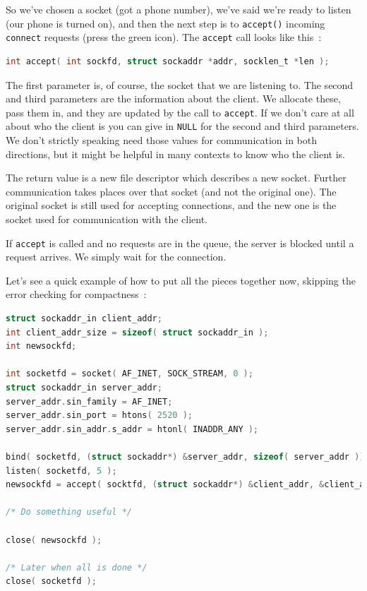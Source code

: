 So we've chosen a socket (got a phone number), we've said we're ready to listen (our phone is turned on), and then the next step is to \texttt{accept()} incoming \texttt{connect} requests (press the green icon). The \texttt{accept} call looks like this~\cite{apunix}:

\begin{lstlisting}[language=C]
int accept( int sockfd, struct sockaddr *addr, socklen_t *len ); 
\end{lstlisting}

The first parameter is, of course, the socket that we are listening to. The second and third parameters are the information about the client. We allocate these, pass them in, and they are updated by the call to \texttt{accept}. If we don't care at all about who the client is you can give in \texttt{NULL} for the second and third parameters. We don't strictly speaking need those values for communication in both directions, but it might be helpful in many contexts to know who the client is.

The return value is a new file descriptor which describes a new socket. Further communication takes places over that socket (and not the original one). The original socket is still used for accepting connections, and the new one is the socket used for communication with the client.

If \texttt{accept} is called and no requests are in the queue, the server is blocked until a request arrives. We simply wait for the connection.

Let's see a quick example of how to put all the pieces together now, skipping the error checking for compactness~\cite{getaddrinfo}:

\begin{lstlisting}[language=C]
struct sockaddr_in client_addr;
int client_addr_size = sizeof( struct sockaddr_in );
int newsockfd;

int socketfd = socket( AF_INET, SOCK_STREAM, 0 );
struct sockaddr_in server_addr;
server_addr.sin_family = AF_INET;
server_addr.sin_port = htons( 2520 );
server_addr.sin_addr.s_addr = htonl( INADDR_ANY );

bind( socketfd, (struct sockaddr*) &server_addr, sizeof( server_addr ));
listen( socketfd, 5 );
newsockfd = accept( socktfd, (struct sockaddr*) &client_addr, &client_addr_size );

/* Do something useful */

close( newsockfd );

/* Later when all is done */
close( socketfd );
\end{lstlisting}

